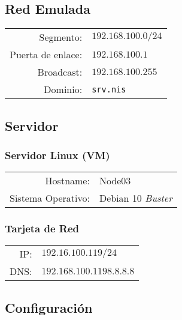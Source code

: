 \documentclass[../main.tex]{subfiles}
\begin{document}
\subsection{Red Emulada}\label{sec:red_emu}

\begin{table}[H]
  \centering
  \begin{tabular}{rl}
    
    Segmento:&$192.168.100.0/24$\\
    Puerta de enlace:&$192.168.100.1$\\
    Broadcast:&$192.168.100.255$\\
    Dominio:&\lstinline|srv.nis|\\
  \end{tabular}
\end{table}

\subsection{Servidor}\label{sec:servidor}

\subsubsection{Servidor Linux (VM)}\label{sec:slvm}


\begin{table}[H]
  \centering
  \begin{tabular}{rl}
    
    Hostname: &Node03\\
    Sistema Operativo: & Debian 10 \textit{Buster}\\
  \end{tabular}
\end{table}

\subsubsection{Tarjeta de Red}\label{sec:tr}

\begin{table}[H]
  \centering
  \begin{tabular}{rl}
    
    IP:&$192.16.100.119/24$\\
    DNS:&$192.168.100.119 8.8.8.8$\\
  \end{tabular}
\end{table}

\subsection{Configuración}\label{sec:serv_conf}
\end{document}
